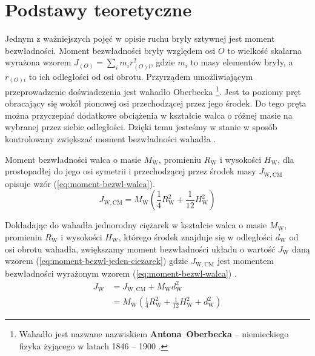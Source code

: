 \documentclass[twocolumn, a4paper, polish, 10pt]{article}
\begin{document}
\section{Podstawy teoretyczne}
Jednym z ważniejszych pojęć w opisie ruchu bryły sztywnej jest moment bezwładności. Moment bezwładności bryły względem osi $O$ to wielkość skalarna wyrażona wzorem $J_{(O)}=\sum_{i}m_{i}r_{(O)i}^{2}$, gdzie $m_i$ to masy elementów bryły, a $r_{(O)i}$ to ich odległości od osi obrotu.
Przyrządem umożliwiającym przeprowadzenie doświadczenia jest wahadło Oberbecka \footnote{Wahadło jest nazwane nazwiskiem \textbf{Antona~Oberbecka} – niemieckiego fizyka żyjącego w latach 1846 – 1900 \cite{oberbeck-wiki}.}.
Jest to poziomy pręt obracający się wokół pionowej osi przechodzącej przez jego środek.
Do tego pręta można przyczepiać dodatkowe obciążenia w kształcie walca o różnej masie na wybranej przez siebie odległości.
Dzięki temu jesteśmy w stanie w sposób kontrolowany zwiększać moment bezwładności wahadła \cite{pracownia-fizyczna-m7}.

Moment bezwładności walca o masie $M_\mathrm{W}$, promieniu $R_\mathrm{W}$ i wysokości $H_\mathrm{W}$, dla prostopadłej do jego osi symetrii i przechodzącej przez środek masy $J_{\mathrm{W,CM}}$ opisuje wzór (\ref{eq:moment-bezwl-walca}).
\begin{equation}
    J_{\mathrm{W,CM}} 
    = M_\mathrm{W} \left(
        \frac{1}{4} R_\mathrm{W}^2 + \frac{1}{12} H_\mathrm{W}^2
    \right)
\label{eq:moment-bezwl-walca}
\end{equation}

Dokładając do wahadła jednorodny ciężarek w kształcie walca o masie $M_\mathrm{W}$, promieniu $R_\mathrm{W}$ i wysokości $H_\mathrm{W}$, którego środek znajduje się w odległości $d_\mathrm{W}$ od osi obrotu wahadła, zwiększamy moment bezwładności układu o wartość $J_{\mathrm{W}}$ daną wzorem (\ref{eq:moment-bezwl-jeden-ciezarek}) gdzie $J_{\mathrm{W,CM}}$ jest momentem bezwładności wyrażonym wzorem (\ref{eq:moment-bezwl-walca}) \cite{pracownia-fizyczna-m7}.
\begin{equation}
\begin{split}
    J_{\mathrm{W}} 
    &= J_{\mathrm{W,CM}} + M_\mathrm{W} d_\mathrm{W}^2 \\
    &= M_\mathrm{W} \left(
        \frac{1}{4} R_\mathrm{W}^2 + \frac{1}{12} H_\mathrm{W}^2 + d_\mathrm{W}^2
    \right)
\label{eq:moment-bezwl-jeden-ciezarek}
\end{split}
\end{equation}
\end{document}
